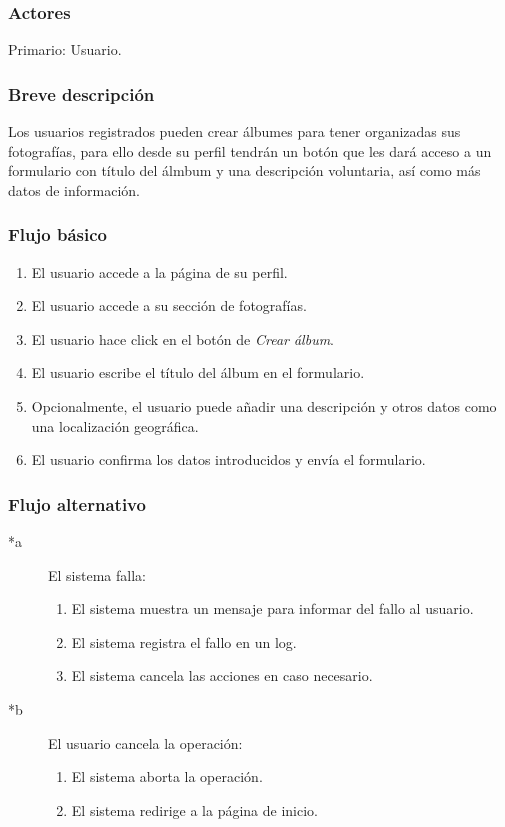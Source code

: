 \documentclass[12pt, a4paper, titlepage]{article}
\begin{document}
\subsubsection{Actores}
Primario: Usuario.
\subsubsection{Breve descripción}
Los usuarios registrados pueden crear álbumes para tener organizadas sus fotografías, para ello desde su perfil tendrán un botón que les dará acceso a un formulario con título del álmbum y una descripción voluntaria, así como más datos de información.

\subsubsection{Flujo básico}
\begin{enumerate}
	\item El usuario accede a la página de su perfil.
	\item El usuario accede a su sección de fotografías.
	\item El usuario hace click en el botón de \textit{Crear álbum}.
	\item El usuario escribe el título del álbum en el formulario.
	\item Opcionalmente, el usuario puede añadir una descripción y otros datos como una localización geográfica.
	\item El usuario confirma los datos introducidos y envía el formulario.
\end{enumerate}
\subsubsection{Flujo alternativo}

\begin{description}
	\item [*a] El sistema falla:
	\begin{enumerate}
		\item El sistema muestra un mensaje para informar del fallo al usuario.
		\item El sistema registra el fallo en un log.
		\item El sistema cancela las acciones en caso necesario.
	\end{enumerate}
\end{description}

\begin{description}
	\item [*b] El usuario cancela la operación:
	\begin{enumerate}
		\item El sistema aborta la operación.
		\item El sistema redirige a la página de inicio.
	\end{enumerate}
\end{description}
\end{document}
